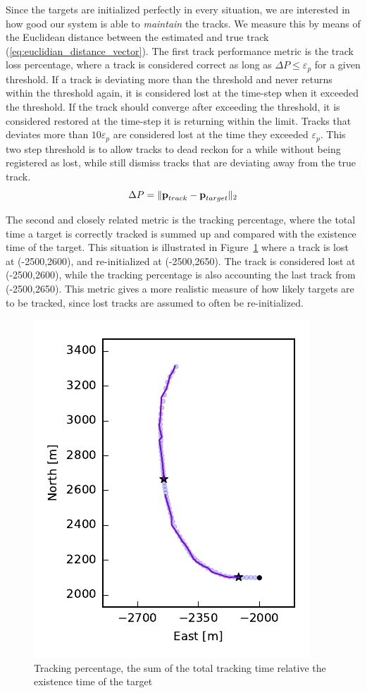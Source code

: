 Since the targets are initialized perfectly in every situation, we are interested in how good our system is able to \emph{maintain} the tracks. We measure this by means of the Euclidean distance between the estimated and true track (\ref{eq:euclidian_distance_vector}). The first track performance metric is the track loss percentage, where a track is considered correct as long as \(\Delta P \leq \varepsilon_p\) for a given threshold. If a track is deviating more than the threshold and never returns within the threshold again, it is considered lost at the time-step when it exceeded the threshold. If the track should converge after exceeding the threshold, it is considered restored at the time-step it is returning within the limit. Tracks that deviates more than \(10\varepsilon_p\) are considered lost at the time they exceeded \(\varepsilon_p\). This two step threshold is to allow tracks to dead reckon for a while without being registered as lost, while still dismiss tracks that are deviating away from the true track.
\begin{equation}
	\Delta P = \| \boldsymbol{\mathbf{p}}_{track}-\boldsymbol{\mathbf{p}}_{target} \|_2
\label{eq:euclidian_distance_vector}
\end{equation}

The second and closely related metric is the tracking percentage, where the total time a target is correctly tracked is summed up and compared with the existence time of the target. This situation is illustrated in Figure~\ref{fig:track_percentage} where a track is lost at (-2500,2600), and re-initialized at (-2500,2650). The track is considered lost at (-2500,2600), while the tracking percentage is also accounting the last track from (-2500,2650). This metric gives a more realistic measure of how likely targets are to be tracked, since lost tracks are assumed to often be re-initialized. 
\begin{figure}[H]
\centering
\includegraphics{Figures/plots/TrackingPercentageExample.pdf}
\caption{Tracking percentage, the sum of the total tracking time relative the existence time of the target}\label{fig:track_percentage}
\end{figure}

